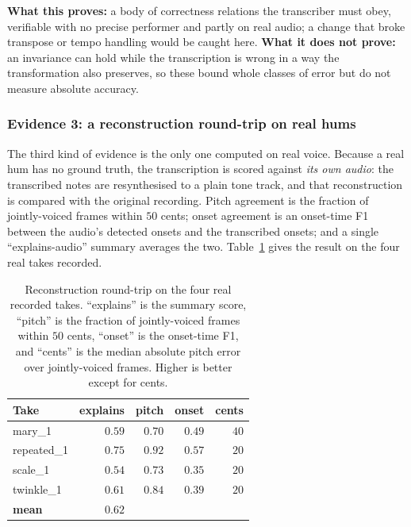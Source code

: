 \documentclass[12pt,a4paper]{article}
\begin{document}
\textbf{What this proves:} a body of correctness relations the transcriber must
obey, verifiable with no precise performer and partly on real audio; a change that
broke transpose or tempo handling would be caught here. \textbf{What it does not
prove:} an invariance can hold while the transcription is wrong in a way the
transformation also preserves, so these bound whole classes of error but do not
measure absolute accuracy.

\subsubsection{Evidence 3: a reconstruction round-trip on real hums}
\label{sec:roundtrip}

The third kind of evidence is the only one computed on real voice. Because a real
hum has no ground truth, the transcription is scored against \emph{its own audio}:
the transcribed notes are resynthesised to a plain tone track, and that
reconstruction is compared with the original recording. Pitch agreement is the
fraction of jointly-voiced frames within $50$ cents; onset agreement is an
onset-time F1 between the audio's detected onsets and the transcribed onsets; and
a single ``explains-audio'' summary averages the two. Table~\ref{tab:roundtrip}
gives the result on the four real takes recorded.

\begin{table}[H]
\centering
\caption{Reconstruction round-trip on the four real recorded takes. ``explains''
is the summary score, ``pitch'' is the fraction of jointly-voiced frames within
$50$ cents, ``onset'' is the onset-time F1, and ``cents'' is the median absolute
pitch error over jointly-voiced frames. Higher is better except for cents.}
\label{tab:roundtrip}
\begin{tabular}{l r r r r}
\toprule
\textbf{Take} & \textbf{explains} & \textbf{pitch} & \textbf{onset} &
\textbf{cents} \\
\midrule
mary\_1     & $0.59$ & $0.70$ & $0.49$ & $40$ \\
repeated\_1 & $0.75$ & $0.92$ & $0.57$ & $20$ \\
scale\_1    & $0.54$ & $0.73$ & $0.35$ & $20$ \\
twinkle\_1  & $0.61$ & $0.84$ & $0.39$ & $20$ \\
\midrule
\textbf{mean} & $\mathbf{0.62}$ & & & \\
\bottomrule
\end{tabular}
\end{table}
\end{document}
